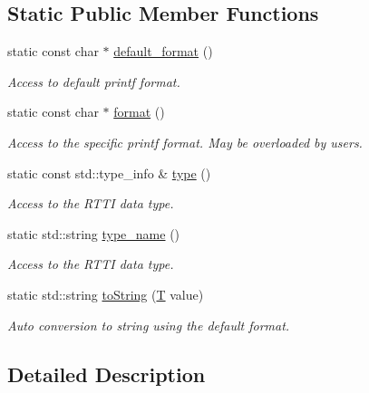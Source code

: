 \subsection*{Static Public Member Functions}
\begin{DoxyCompactItemize}
\item 
static const char $\ast$ \hyperlink{struct_d_d4hep_1_1_primitive_a27dce7707319f621a39cc7d90d55bfb0}{default\_\-format} ()
\begin{DoxyCompactList}\small\item\em Access to default printf format. \item\end{DoxyCompactList}\item 
static const char $\ast$ \hyperlink{struct_d_d4hep_1_1_primitive_ae24ddbca63bd0cac596c39c519d134f8}{format} ()
\begin{DoxyCompactList}\small\item\em Access to the specific printf format. May be overloaded by users. \item\end{DoxyCompactList}\item 
static const std::type\_\-info \& \hyperlink{struct_d_d4hep_1_1_primitive_afd4ccf13e6eaa9bdecdf053a0b0dee50}{type} ()
\begin{DoxyCompactList}\small\item\em Access to the RTTI data type. \item\end{DoxyCompactList}\item 
static std::string \hyperlink{struct_d_d4hep_1_1_primitive_adc0e54033e0242d525537cfa2900f3b8}{type\_\-name} ()
\begin{DoxyCompactList}\small\item\em Access to the RTTI data type. \item\end{DoxyCompactList}\item 
static std::string \hyperlink{struct_d_d4hep_1_1_primitive_a180947d8d7ef75a31553b3c200bbf136}{toString} (\hyperlink{class_t}{T} value)
\begin{DoxyCompactList}\small\item\em Auto conversion to string using the default format. \item\end{DoxyCompactList}\end{DoxyCompactItemize}


\subsection{Detailed Description}
